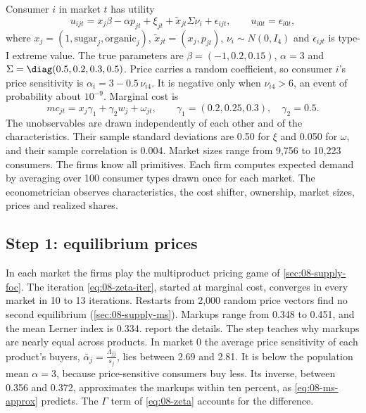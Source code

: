 Consumer $i$ in market $t$ has utility
\begin{equation}\label{eq:08-sim-utility}
  u_{ijt} = x_j\beta - \alpha p_{jt} + \xi_{jt} + \tilde x_{jt}\Sigma\nu_i + \epsilon_{ijt}, \qquad
  u_{i0t} = \epsilon_{i0t},
\end{equation}
where $x_j = (1, \text{sugar}_j, \text{organic}_j)$, $\tilde x_{jt} = (x_j, p_{jt})$, $\nu_i \sim N(0, I_4)$ and
$\epsilon_{ijt}$ is type-I extreme value. The true parameters are $\beta = (-1, 0.2, 0.15)$, $\alpha = 3$ and
$\Sigma = \diag(0.5, 0.2, 0.3, 0.5)$. Price carries a random coefficient, so consumer $i$'s price sensitivity is
$\alpha_i = 3 - 0.5\,\nu_{i4}$. It is negative only when $\nu_{i4} > 6$, an event of probability about $10^{-9}$.
Marginal cost is
\begin{equation}\label{eq:08-sim-cost}
  mc_{jt} = x_j\gamma_1 + \gamma_2 w_j + \omega_{jt}, \qquad \gamma_1 = (0.2, 0.25, 0.3),\quad \gamma_2 = 0.5 .
\end{equation}
The unobservables are drawn independently of each other and of the characteristics. Their sample standard deviations are
0.50 for $\xi$ and 0.050 for $\omega$, and their sample correlation is 0.004. Market sizes range from 9,756 to 10,223
consumers. The firms know all primitives. Each firm computes expected demand by averaging over 100 consumer types drawn
once for each market. The econometrician observes characteristics, the cost shifter, ownership, market sizes, prices
and realized shares.

\subsection{Step 1: equilibrium prices}\label{sec:08-worked-eq}

In each market the firms play the multiproduct pricing game of \cref{sec:08-supply-foc}. The iteration
\eqref{eq:08-zeta-iter}, started at marginal cost, converges in every market in 10 to 13 iterations. Restarts from 2,000
random price vectors find no second equilibrium (\cref{sec:08-supply-ms}). Markups range from 0.348 to 0.451, and the
mean Lerner index is 0.334.  report the details. The step teaches why markups are
nearly equal across products. In market 0 the average price sensitivity of each product's buyers,
$\bar\alpha_j = \frac{\Lambda_{jj}}{s_j}$, lies between 2.69 and 2.81. It is below the population mean $\alpha = 3$,
because price-sensitive consumers buy less. Its inverse, between 0.356 and 0.372, approximates the markups within ten
percent, as \eqref{eq:08-ms-approx} predicts. The $\Gamma$ term of \eqref{eq:08-zeta} accounts for the difference.

